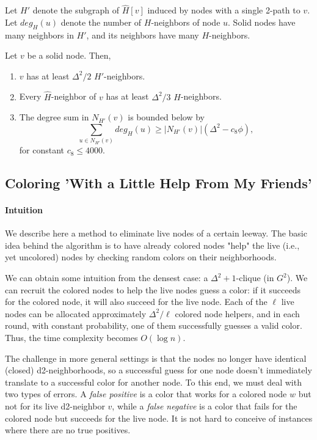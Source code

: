 Let $H'$ denote the subgraph of $\hat{H}[v]$ induced by nodes with a single 2-path to $v$.
Let $deg_H(u)$ denote the number of $H$-neighbors of node $u$.
Solid nodes have many neighbors in $H'$, and its neighbors have many $H$-neighbors.
\begin{lemma}
Let $v$ be a solid node.
Then,
\begin{enumerate} 
  \item $v$ has at least $\Delta^2/2$ $H'$-neighbors.
  \item Every $\hat{H}$-neighbor of $v$ has at least $\Delta^2/3$ $H$-neighbors.
  \item The degree sum in $N_{H'}(v)$ is bounded below by
      \[ \sum_{u \in N_{H'}(v)} deg_H(u) \ge |N_{H'}(v)| (\Delta^2 - c_8\phi), \]
     for constant $c_8 \le 4000$.
\end{enumerate}
\label{L:H-neighbors}
\end{lemma}

\subsection{Coloring 'With a Little Help From My Friends'}

\paragraph{Intuition}
We describe here a method to eliminate live nodes of a certain leeway.
The basic idea behind the algorithm is to have already colored nodes "help" the live (i.e., yet uncolored) nodes by checking random colors on their neighborhoods.

We can obtain some intuition from the densest case: a $\Delta^2+1$-clique (in $G^2$).
We can recruit the colored nodes to help the live nodes guess a color: if it succeeds for the colored node, it will also succeed for the live node. Each of the $\ell$ live nodes can be allocated approximately $\Delta^2/\ell$ colored node helpers, and in each round, with constant probability, one of them successfully guesses a valid color. Thus, the time complexity becomes $O(\log n)$.

The challenge in more general settings is that the nodes no longer have identical (closed) d2-neighborhoods, so a successful guess for one node doesn't immediately translate to a successful color for another node.
To this end, we must deal with two types of errors.
A \emph{false positive} is a color that works for a colored node $w$ but not for its live d2-neighbor $v$, while a \emph{false negative} is a color that fails for the colored node but succeeds for the live node.
It is not hard to conceive of instances where there are no true positives.

